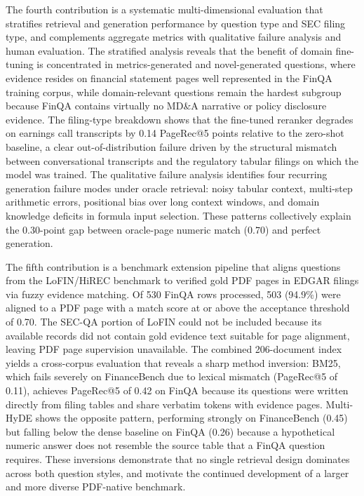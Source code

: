 \documentclass[12pt,twoside,maitrise]{dms}
\theoremstyle{definition}
\numberwithin{equation}{section}
\numberwithin{table}{chapter}
\numberwithin{figure}{chapter}
\begin{document}
The fourth contribution is a systematic multi-dimensional evaluation that stratifies
retrieval and generation performance by question type and SEC filing type, and complements
aggregate metrics with qualitative failure analysis and human evaluation. The stratified
analysis reveals that the benefit of domain fine-tuning is concentrated in metrics-generated
and novel-generated questions, where evidence resides on financial statement pages well
represented in the FinQA training corpus, while domain-relevant questions remain the
hardest subgroup because FinQA contains virtually no MD\&A narrative or policy disclosure
evidence. The filing-type breakdown shows that the fine-tuned reranker degrades on
earnings call transcripts by 0.14 PageRec@5 points relative to the zero-shot baseline, a
clear out-of-distribution failure driven by the structural mismatch between conversational
transcripts and the regulatory tabular filings on which the model was trained. The
qualitative failure analysis identifies four recurring generation failure modes under oracle
retrieval: noisy tabular context, multi-step arithmetic errors, positional bias over long
context windows, and domain knowledge deficits in formula input selection. These patterns
collectively explain the 0.30-point gap between oracle-page numeric match (0.70) and
perfect generation.

The fifth contribution is a benchmark extension pipeline that aligns questions from the
LoFIN/HiREC benchmark to verified gold PDF pages in EDGAR filings via fuzzy evidence
matching. Of 530 FinQA rows processed, 503 (94.9\%) were aligned to a PDF page with
a match score at or above the acceptance threshold of 0.70. The SEC-QA portion of
LoFIN could not be included because its available records did not contain gold evidence
text suitable for page alignment, leaving PDF page supervision unavailable. The combined
206-document index yields a cross-corpus evaluation that reveals a sharp method inversion:
BM25, which fails severely on FinanceBench due to lexical mismatch (PageRec@5 of 0.11),
achieves PageRec@5 of 0.42 on FinQA because its questions were written directly from
filing tables and share verbatim tokens with evidence pages. Multi-HyDE shows the
opposite pattern, performing strongly on FinanceBench (0.45) but falling below the dense
baseline on FinQA (0.26) because a hypothetical numeric answer does not resemble the
source table that a FinQA question requires. These inversions demonstrate that no single
retrieval design dominates across both question styles, and motivate the continued
development of a larger and more diverse PDF-native benchmark.
\end{document}
